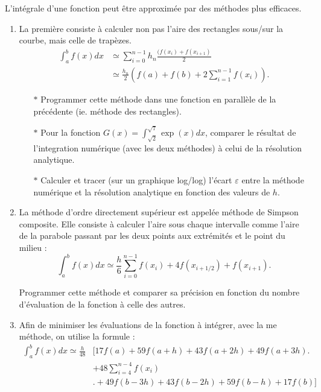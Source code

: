 L'intégrale d'une fonction  peut être approximée par des
méthodes plus efficaces.
\begin{enumerate}
\item La  première consiste  à calculer non  pas l'aire  des rectangles
  sous/sur la courbe, mais celle de trapèzes.
  \begin{equation}
    \begin{split}
      \int_a^b        f(x)dx       &\simeq        \sum_{i=0}^{n-1}       h_n
      \frac{(f(x_i)+f(x_{i+1})}{2}\\ &\simeq \frac{h_n}{2} \left(f(a)+f(b) +
      2\sum_{i=1}^{n-1} f(x_i) \right).
    \end{split}
  \end{equation}

  \begin{itemize}
  \item[$\ast$] Programmer  cette  méthode dans une fonction en parallèle de la précédente
    (ie. méthode des rectangles).
  \item[$\ast$] Pour la fonction $G(x) = \int_{\sqrt{2}}^{\sqrt{7}} \exp(x) dx$, 
    comparer le résultat de l'integration numérique (avec les deux méthodes) à celui de la résolution analytique.
  \item[$\ast$] Calculer et tracer (sur  un graphique  log/log) l'écart $\varepsilon$ entre la méthode numérique
    et la résolution analytique en   fonction  des  valeurs   de  $h$.
  \end{itemize}


\item La méthode d'ordre directement  supérieur est appelée méthode de
  Simpson  composite.  Elle  consiste  à calculer  l'aire sous  chaque
  intervalle comme l'aire  de la parabole passant par  les deux points
  aux extrémités et le point du milieu :
  \begin{equation}
    \int_a^b   f(x)dx  \simeq   \frac{h}{6}\sum_{i=0}^{n-1}  f(x_i)   +  4
    f(x_{i+1/2}) + f(x_{i+1}) .
  \end{equation}

  Programmer  cette méthode  et  comparer sa  précision  en fonction  du
  nombre d'évaluation de la fonction à celle des autres.
\item  Afin de minimiser les évaluations de la fonction à intégrer, avec la me méthode, 
  on utilise la formule :
 \begin{equation}
\begin{split}
\int_a^b  f(x)dx   \simeq  \frac{h}{48}  &\biggl[17f(a)   +  59f(a+h)+
  43f(a+2h)+
  49f(a+3h)\biggr.\\ &+48\sum_{i=4}^{n-4}f(x_i)\\ &\biggl.+49f(b-3h)+43f(b-2h)+59f(b-h)+17f(b)\biggr]
\end{split}
 \end{equation}
 

\end{enumerate}
